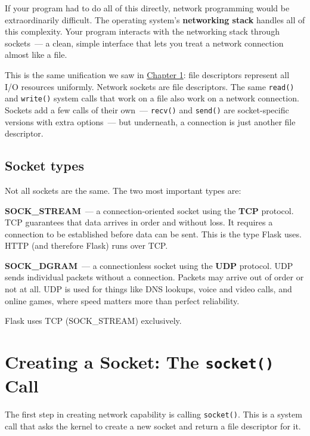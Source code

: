\noindent{}If your program had to do all of this directly, network programming would be extraordinarily difficult. The operating system's \textbf{networking stack} handles all of this complexity. Your program interacts with the networking stack through sockets~--- a clean, simple interface that lets you treat a network connection almost like a file.

This is the same unification we saw in \hyperref[ch:01-command-to-process]{Chapter 1}: file descriptors represent all I/O resources uniformly. Network sockets are file descriptors. The same \texttt{read()} and \texttt{write()} system calls that work on a file also work on a network connection. Sockets add a few calls of their own~--- \texttt{recv()} and \texttt{send()} are socket-specific versions with extra options~--- but underneath, a connection is just another file descriptor.

\subsection*{Socket types}\label{03-network-capability:socket-types}

Not all sockets are the same. The two most important types are:

\textbf{SOCK\_STREAM}~--- a connection-oriented socket using the \textbf{TCP} protocol. TCP guarantees that data arrives in order and without loss. It requires a connection to be established before data can be sent. This is the type Flask uses. HTTP (and therefore Flask) runs over TCP.

\textbf{SOCK\_DGRAM}~--- a connectionless socket using the \textbf{UDP} protocol. UDP sends individual packets without a connection. Packets may arrive out of order or not at all. UDP is used for things like DNS lookups, voice and video calls, and online games, where speed matters more than perfect reliability.

Flask uses TCP (SOCK\_STREAM) exclusively.

\setcounter{section}{1}
\section{\texorpdfstring{Creating a Socket: The \texttt{socket()} Call}{Creating a Socket: The socket() Call}}\label{03-network-capability:32-creating-a-socket-the-socket-call}

The first step in creating network capability is calling \texttt{socket()}. This is a system call that asks the kernel to create a new socket and return a file descriptor for it.

